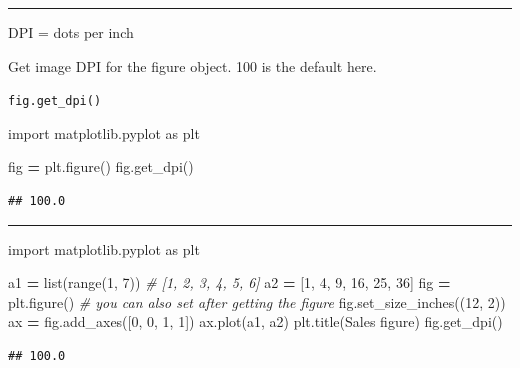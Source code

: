\documentclass[
]{book}
\newenvironment{Shaded}{\begin{snugshade}}{\end{snugshade}}
\newcommand{\BuiltInTok}[1]{#1}
\newcommand{\CommentTok}[1]{\textcolor[rgb]{0.56,0.35,0.01}{\textit{#1}}}
\newcommand{\DecValTok}[1]{\textcolor[rgb]{0.00,0.00,0.81}{#1}}
\newcommand{\ImportTok}[1]{#1}
\newcommand{\NormalTok}[1]{#1}
\newcommand{\OperatorTok}[1]{\textcolor[rgb]{0.81,0.36,0.00}{\textbf{#1}}}
\newcommand{\StringTok}[1]{\textcolor[rgb]{0.31,0.60,0.02}{#1}}
\theoremstyle{definition}
\theoremstyle{definition}
\theoremstyle{definition}
\theoremstyle{definition}
\theoremstyle{remark}
\begin{document}
\begin{center}\rule{0.5\linewidth}{0.5pt}\end{center}

DPI = dots per inch

Get image DPI for the figure object. 100 is the default here.

\texttt{fig.get\_dpi()}

\begin{Shaded}
\begin{Highlighting}[]
\ImportTok{import}\NormalTok{ matplotlib.pyplot }\ImportTok{as}\NormalTok{ plt}

\NormalTok{fig }\OperatorTok{=}\NormalTok{ plt.figure()}
\NormalTok{fig.get\_dpi()}
\end{Highlighting}
\end{Shaded}

\begin{verbatim}
## 100.0
\end{verbatim}

\begin{center}\rule{0.5\linewidth}{0.5pt}\end{center}

\begin{Shaded}
\begin{Highlighting}[]
\ImportTok{import}\NormalTok{ matplotlib.pyplot }\ImportTok{as}\NormalTok{ plt}

\NormalTok{a1 }\OperatorTok{=} \BuiltInTok{list}\NormalTok{(}\BuiltInTok{range}\NormalTok{(}\DecValTok{1}\NormalTok{, }\DecValTok{7}\NormalTok{)) }\CommentTok{\# [1, 2, 3, 4, 5, 6]}
\NormalTok{a2 }\OperatorTok{=}\NormalTok{ [}\DecValTok{1}\NormalTok{, }\DecValTok{4}\NormalTok{, }\DecValTok{9}\NormalTok{, }\DecValTok{16}\NormalTok{, }\DecValTok{25}\NormalTok{, }\DecValTok{36}\NormalTok{]}
\NormalTok{fig }\OperatorTok{=}\NormalTok{ plt.figure()}
\CommentTok{\# you can also set after getting the figure}
\NormalTok{fig.set\_size\_inches((}\DecValTok{12}\NormalTok{, }\DecValTok{2}\NormalTok{))}
\NormalTok{ax }\OperatorTok{=}\NormalTok{ fig.add\_axes([}\DecValTok{0}\NormalTok{, }\DecValTok{0}\NormalTok{, }\DecValTok{1}\NormalTok{, }\DecValTok{1}\NormalTok{])}
\NormalTok{ax.plot(a1, a2)}
\NormalTok{plt.title(}\StringTok{\textquotesingle{}Sales figure\textquotesingle{}}\NormalTok{)}
\NormalTok{fig.get\_dpi()}
\end{Highlighting}
\end{Shaded}

\begin{verbatim}
## 100.0
\end{verbatim}
\end{document}
